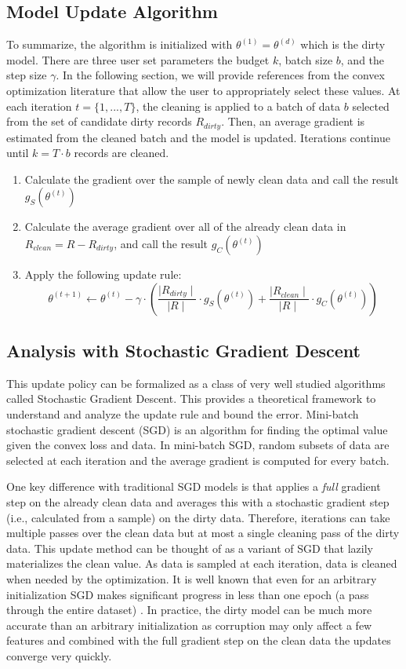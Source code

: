 \subsection{Model Update Algorithm}
To summarize, the algorithm is initialized with $\theta^{(1)} = \theta^{(d)}$ which is the dirty model.
There are three user set parameters the budget $k$, batch size $b$, and the step size $\gamma$.
In the following section, we will provide references from the convex optimization literature that allow the user to appropriately select these values.
At each iteration $t=\{1,...,T\}$, the cleaning is applied to a batch of data $b$ selected from the set of candidate dirty records $R_{dirty}$.
Then, an average gradient is estimated from the cleaned batch and the model is updated.
Iterations continue until $k = T \cdot b$ records are cleaned.

\begin{enumerate}[noitemsep]
	\item Calculate the gradient over the sample of newly clean data and call the result $g_S(\theta^{(t)})$
	\item Calculate the average gradient over all of the already clean data in $R_{clean}=R-R_{dirty}$, and call the result $g_C(\theta^{(t)})$
	\item Apply the following update rule:
	\[
	\theta^{(t+1)} \leftarrow \theta^{(t)} - \gamma \cdot(\frac{\mid R_{dirty} \mid}{\mid R \mid} \cdot g_S(\theta^{(t)}) + \frac{\mid R_{clean} \mid}{\mid R \mid} \cdot  g_C(\theta^{(t)}))
	\]
\end{enumerate} 

\subsection{Analysis with Stochastic Gradient Descent}\label{sgd}
This update policy can be formalized as a class of very well studied algorithms called Stochastic Gradient Descent.
This provides a theoretical framework to understand and analyze the update rule and bound the error.
Mini-batch stochastic gradient descent (SGD) is an algorithm for finding the optimal value
given the convex loss and data.
In mini-batch SGD, random subsets of data are selected at each iteration and the average gradient is computed for every batch.

One key difference with traditional SGD models is that \sys applies a \emph{full} gradient step on the already clean data and averages this with a stochastic gradient step (i.e., calculated from a sample) on the dirty data. 
Therefore, \sys iterations can take multiple passes over the clean data but at most a single cleaning pass of the dirty data.
This update method can be thought of as a variant of SGD that lazily materializes the clean value.
As data is sampled at each iteration, data is cleaned when needed by the optimization.
It is well known that even for an arbitrary initialization SGD makes significant progress in less than one epoch (a pass through the entire dataset) \cite{bottou2012stochastic}.
In practice, the dirty model can be much more accurate than an arbitrary initialization as corruption may only affect a few features and combined with the full gradient step on the clean data the updates converge very quickly.

